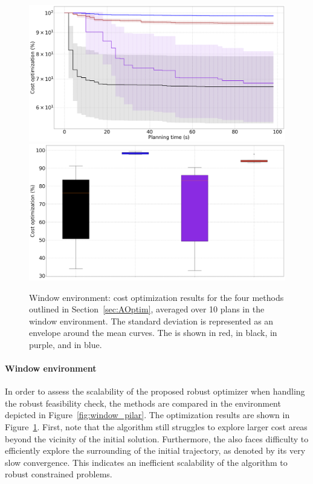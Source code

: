 \begin{figure} [h!]
    \centering
    \includegraphics[width=0.8\linewidth]{figures/accuracy/all_methods_window.png} \\
    \includegraphics[width=0.8\linewidth]{figures/accuracy/bplot_all_methods_window.png}
    \caption{Window environment: cost optimization results for the four methods outlined in Section~\ref{sec:AOptim}, averaged over 10 plans in the window environment. 
    The standard deviation is represented as an envelope around the mean curves.
    The  is shown in red,  in black,  in purple, and  in blue.}%
    \label{fig:acc_window}%
\end{figure}

\paragraph{Window environment}

In order to assess the scalability of the proposed robust optimizer when handling the robust feasibility check, the methods are compared in the environment depicted in Figure~\ref{fig:window_pilar}.
The optimization results are shown in Figure~\ref{fig:acc_window}.
First, note that the  algorithm still struggles to explore larger cost areas beyond the vicinity of the initial solution.
Furthermore, the  also faces difficulty to efficiently explore the surrounding of the initial trajectory, as denoted by its very slow convergence.
This indicates an inefficient scalability of the algorithm to robust constrained problems.

